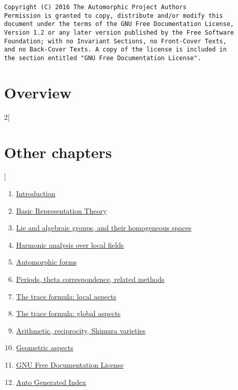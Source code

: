 \documentclass[oneside]{stacks-project-book}
\theoremstyle{plain}
\theoremstyle{definition}
\theoremstyle{remark}
\numberwithin{equation}{subsection}
\begin{document}
\label{algebraicgroups-section-phantom}
\hypertarget{0200}{}
\reversemarginpar{}

\begin{verbatim}
Copyright (C) 2016 The Automorphic Project Authors
Permission is granted to copy, distribute and/or modify this
document under the terms of the GNU Free Documentation License,
Version 1.2 or any later version published by the Free Software
Foundation; with no Invariant Sections, no Front-Cover Texts,
and no Back-Cover Texts. A copy of the license is included in
the section entitled "GNU Free Documentation License".
\end{verbatim}



\section{Overview}
\label{algebraicgroups-section-overview}
\hypertarget{0201}{}
\reversemarginpar{}

\noindent





\begin{multicols}{2}[\section{Other chapters}]
\noindent
\begin{enumerate}
\item \hyperref[introduction-section-phantom]{Introduction}
\item \hyperref[representationtheory-section-phantom]{Basic Representation Theory}
\item \hyperref[algebraicgroups-section-phantom]{Lie and algebraic groups, and their homogeneous spaces}
\item \hyperref[harmonicanalysis-section-phantom]{Harmonic analysis over local fields}
\item \hyperref[automorphicforms-section-phantom]{Automorphic forms}
\item \hyperref[periods-section-phantom]{Periods, theta correspondence, related methods}
\item \hyperref[traceformulalocal-section-phantom]{The trace formula: local aspects}
\item \hyperref[traceformulaglobal-section-phantom]{The trace formula: global aspects}
\item \hyperref[arithmetic-section-phantom]{Arithmetic, reciprocity, Shimura varieties}
\item \hyperref[geometric-section-phantom]{Geometric aspects}
\item \hyperref[fdl-section-phantom]{GNU Free Documentation License}
\item \hyperref[index-section-phantom]{Auto Generated Index}
\end{enumerate}
\end{multicols}
\end{document}
